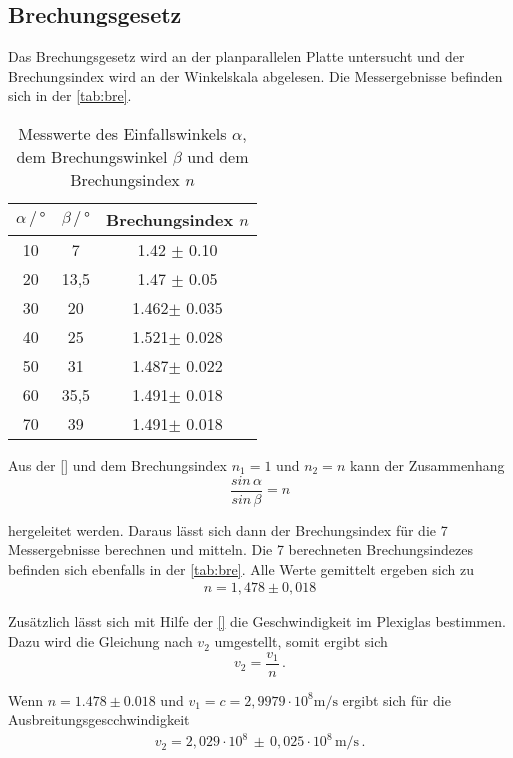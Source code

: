 \subsection{Brechungsgesetz}
Das Brechungsgesetz wird an der planparallelen Platte untersucht und der Brechungsindex wird an der Winkelskala abgelesen. Die Messergebnisse befinden sich in der \autoref{tab:bre}. 
\begin{table}
    \centering
    \caption{Messwerte des Einfallswinkels $\alpha$, dem Brechungswinkel $\beta$ und dem Brechungsindex $n$}
    \label{tab:bre}
    \begin{tabular}{c c c}
    \toprule
         $\alpha \, / \, ° $ & $\beta \, / \, °$ & Brechungsindex $n$\\
    \midrule
    10 & 7    & 1.42 $\pm$ 0.10\\
    20 & 13,5 & 1.47 $\pm$ 0.05\\
    30 & 20   & 1.462$\pm$ 0.035\\
    40 & 25   & 1.521$\pm$ 0.028\\
    50 & 31   & 1.487$\pm$ 0.022\\
    60 & 35,5 & 1.491$\pm$ 0.018\\
    70 & 39   & 1.491$\pm$ 0.018\\
    \bottomrule
    \end{tabular}
\end{table}

\noindent
Aus der \autoref{} und dem Brechungsindex $n_1 = 1$ und $n_2 = n$ kann der Zusammenhang 
\begin{equation}
    \frac{sin \, \alpha}{sin \, \beta} = n
\end{equation}

\noindent
hergeleitet werden.
Daraus lässt sich dann der Brechungsindex für die 7 Messergebnisse berechnen und mitteln. Die 7 berechneten Brechungsindezes befinden sich ebenfalls in der \autoref{tab:bre}.
Alle Werte gemittelt ergeben sich zu 
\begin{align*}
    n = 1,478 \pm 0,018
\end{align*} 

Zusätzlich lässt sich mit Hilfe der \autoref{} die Geschwindigkeit im Plexiglas bestimmen. Dazu wird die Gleichung nach $v_2$ umgestellt, somit ergibt sich
\begin{equation}
    v_2 = \frac{v_1}{n} \, .
\end{equation}

\noindent
Wenn $n = 1.478 \pm 0.018$ und $v_1 = c = 2,9979 \cdot 10^8 \si{\meter\per\second}$ ergibt sich für die Ausbreitungsgescchwindigkeit
\begin{align*}
    v_2 = 2,029 \cdot 10^8 \, \pm \, 0,025 \cdot 10^8 \, \si{\meter\per\second} \, .
\end{align*}

